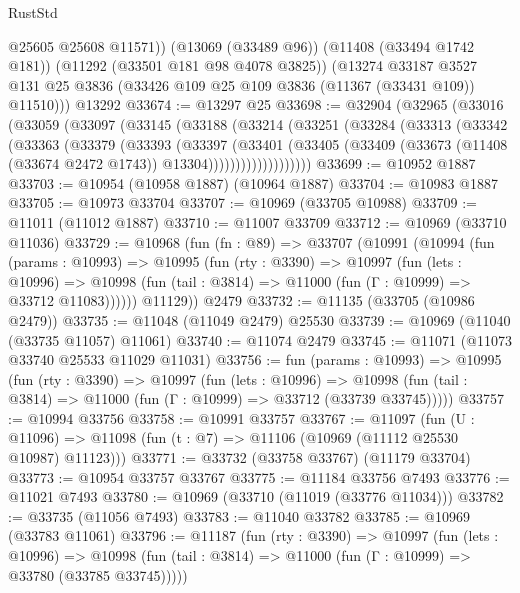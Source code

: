 \begin{lexlean}{RustStd}
\begin{coremodule}
          @25605
          @25608
          @11571))
      (@13069 (@33489 @96))
      (@11408 (@33494 @1742 @181))
      (@11292 (@33501 @181 @98 @4078 @3825))
      (@13274
        @33187
        @3527
        @131
        @25
        @3836
        (@33426 @109 @25 @109 @3836 (@11367 (@33431 @109)) @11510)))
    @13292
@33674 := @13297 @25
@33698 := @32904
    (@32965
      (@33016
        (@33059
          (@33097
            (@33145
              (@33188
                (@33214
                  (@33251
                    (@33284
                      (@33313
                        (@33342
                          (@33363
                            (@33379
                              (@33393
                                (@33397
                                  (@33401
                                    (@33405
                                      (@33409
                                        (@33673
                                          (@11408 (@33674 @2472 @1743))
                                          @13304)))))))))))))))))))
@33699 := @10952 @1887
@33703 := @10954 (@10958 @1887) (@10964 @1887)
@33704 := @10983 @1887
@33705 := @10973 @33704
@33707 := @10969 (@33705 @10988)
@33709 := @11011 (@11012 @1887)
@33710 := @11007 @33709
@33712 := @10969 (@33710 @11036)
@33729 := @10968
    (fun (fn : @89) =>
    @33707
      (@10991
        (@10994
          (fun (params : @10993) =>
          @10995
            (fun (rty : @3390) =>
            @10997
              (fun (lets : @10996) =>
              @10998 (fun (tail : @3814) => @11000 (fun (Γ : @10999) => @33712 @11083))))))
        @11129))
    @2479
@33732 := @11135 (@33705 (@10986 @2479))
@33735 := @11048 (@11049 @2479) @25530
@33739 := @10969 (@11040 (@33735 @11057) @11061)
@33740 := @11074 @2479
@33745 := @11071 (@11073 @33740 @25533 @11029 @11031)
@33756 := fun (params : @10993) =>
  @10995
    (fun (rty : @3390) =>
    @10997
      (fun (lets : @10996) =>
      @10998 (fun (tail : @3814) => @11000 (fun (Γ : @10999) => @33712 (@33739 @33745)))))
@33757 := @10994 @33756
@33758 := @10991 @33757
@33767 := @11097
    (fun (U : @11096) => @11098 (fun (t : @7) => @11106 (@10969 (@11112 @25530 @10987) @11123)))
@33771 := @33732 (@33758 @33767) (@11179 @33704)
@33773 := @10954 @33757 @33767
@33775 := @11184 @33756 @7493
@33776 := @11021 @7493
@33780 := @10969 (@33710 (@11019 (@33776 @11034)))
@33782 := @33735 (@11056 @7493)
@33783 := @11040 @33782
@33785 := @10969 (@33783 @11061)
@33796 := @11187
    (fun (rty : @3390) =>
    @10997
      (fun (lets : @10996) =>
      @10998 (fun (tail : @3814) => @11000 (fun (Γ : @10999) => @33780 (@33785 @33745)))))

\end{coremodule}
\end{lexlean}
